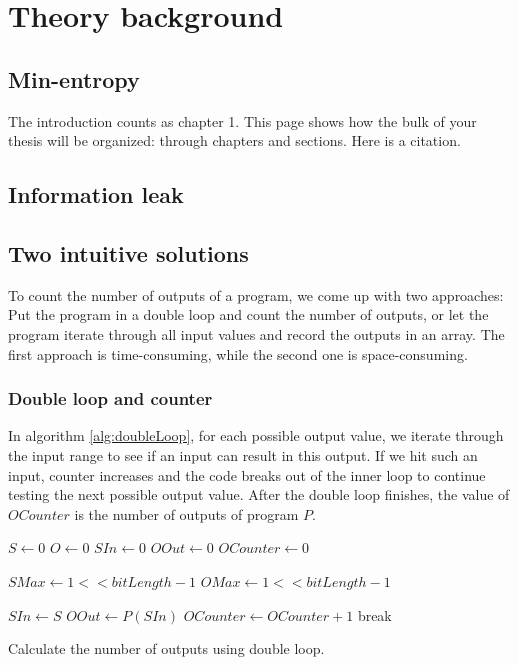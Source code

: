 \chapter{Theory background}
	\label{CH_02}

\section{Min-entropy}
The introduction counts as chapter 1.  This page shows how the bulk of your thesis will be organized: through chapters and sections. Here is a citation.\cite{OBTMBD01}

\section{Information leak}

\section{Two intuitive solutions}
To count the number of outputs of a program, we come up with two approaches: Put the program in a double loop and count the number of outputs, or let the program iterate through all input values and record the outputs in an array. The first approach is time-consuming, while the second one is space-consuming.

\subsection{Double loop and counter}
In algorithm \ref{alg:doubleLoop}, for each possible output value, we iterate through the input range to see if an input can result in this output. If we hit such an input, counter increases and the code breaks out of the inner loop to continue testing the next possible output value. After the double loop finishes, the value of $OCounter$ is the number of outputs of program $P$.

\begin{algorithm}
\begin{algorithmic}
\renewcommand{\algorithmiccomment}[1]{// #1}
\STATE $S \leftarrow 0$
\STATE $O \leftarrow 0$
\STATE $SIn \leftarrow 0$
\STATE $OOut \leftarrow 0$
\STATE $OCounter \leftarrow 0$

\STATE $SMax \leftarrow 1 << bitLength - 1$
\STATE $OMax \leftarrow 1 << bitLength - 1$

\STATE $SIn \leftarrow S$ 
\STATE $OOut \leftarrow P(SIn)$ 
\STATE $OCounter \leftarrow OCounter + 1$
\STATE break
\ENDIF
\ENDFOR
\ENDFOR
\end{algorithmic}

\caption[Double loop]{Calculate the number of outputs using double loop.}
\label{alg:doubleLoop}
\end{algorithm}

